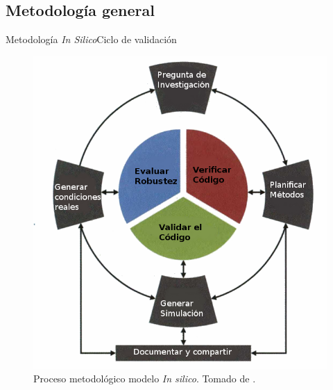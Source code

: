 \documentclass[10pt]{beamer}
\begin{document}
\subsection{Metodología general}
\begin{frame}{Metodología \emph{In Silico}}{Ciclo de validación}

\begin{figure}
\centering{}\includegraphics[scale=0.35]{Feathergraphics/verificationprocess}
\caption{{Proceso metodológico modelo \emph{In silico}. Tomado de  \cite{Hicks2014}.}}
\end{figure}

\end{frame}
\end{document}
